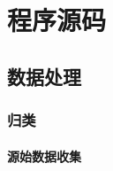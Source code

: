 
\chapter{程序源码}
\zhlipsum[2]
\section{数据处理}
\zhlipsum[1]
\subsection{归类}
\zhlipsum[3]
\subsubsection{源始数据收集}
\zhlipsum[7]